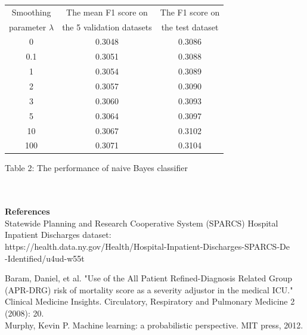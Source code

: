 \documentclass[a4paper]{article}
\begin{document}
\begin{center} 
    \begin{tabular}{|c|c|c|} 
       \hline 
      Smoothing & The mean F1 score on & The F1 score on\\ 
      parameter $\lambda$ & the 5 validation datasets & the test dataset\\ \hline    
      0 & 0.3048 & 0.3086 \\ \hline
      0.1 & 0.3051 & 0.3088 \\ \hline
      1 & 0.3054 & 0.3089 \\ \hline
      2 & 0.3057 & 0.3090 \\ \hline
      3 & 0.3060 & 0.3093 \\ \hline
      5 & 0.3064 & 0.3097 \\ \hline
      10 & 0.3067 & 0.3102 \\ \hline
      100 & 0.3071 & 0.3104 \\ \hline
    \end{tabular} 
\end{center}
 
\centerline
{Table 2: The performance of naive Bayes classifier}

~\\~\\
\noindent
\textbf{\large References\\}
\noindent
[1] Statewide Planning and Research Cooperative System (SPARCS) Hospital Inpatient Discharges dataset: \\
{\small {https://health.data.ny.gov/Health/Hospital-Inpatient-Discharges-\do SPARCS-De\\-Identified/u4ud-w55t}\\}

\noindent
[2] Baram, Daniel, et al. "Use of the All Patient Refined-Diagnosis Related Group (APR-DRG) risk of mortality score as a severity adjustor in the medical ICU." Clinical Medicine Insights. Circulatory, Respiratory and Pulmonary Medicine 2 (2008): 20.\\

\noindent
[3] Murphy, Kevin P. Machine learning: a probabilistic perspective. MIT press, 2012.
\end{document}
